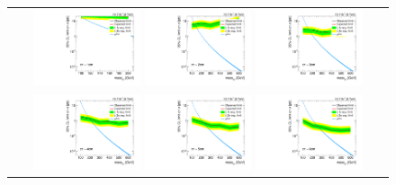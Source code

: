 \begin{figure}[!h]
  \centering 
  \begin{tabular}{c}
    \includegraphics[width=0.29\textwidth]{figures/analysis/Interpretation/ExclusionLimits/LimitPlot_ctau1cm.pdf} 
    \includegraphics[width=0.29\textwidth]{figures/analysis/Interpretation/ExclusionLimits/LimitPlot_ctau2cm.pdf} 
    \includegraphics[width=0.29\textwidth]{figures/analysis/Interpretation/ExclusionLimits/LimitPlot_ctau3cm.pdf} \\
    \includegraphics[width=0.29\textwidth]{figures/analysis/Interpretation/ExclusionLimits/LimitPlot_ctau4cm.pdf} 
    \includegraphics[width=0.29\textwidth]{figures/analysis/Interpretation/ExclusionLimits/LimitPlot_ctau5cm.pdf} 
    \includegraphics[width=0.29\textwidth]{figures/analysis/Interpretation/ExclusionLimits/LimitPlot_ctau6cm.pdf} \\

\end{tabular}
\end{figure}
